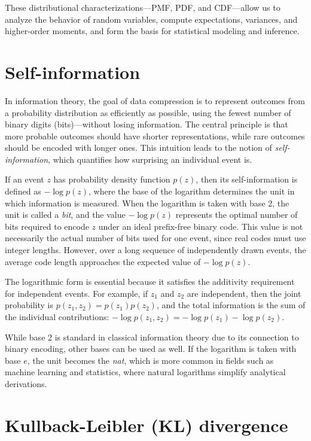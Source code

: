 \documentclass[10pt,twocolumn,article]{memoir}
\begin{document}
These distributional characterizations—PMF, PDF, and CDF—allow us to analyze the behavior of random variables, compute expectations, variances, and higher-order moments, and form the basis for statistical modeling and inference.

\section{Self-information}

In information theory, the goal of data compression is to represent outcomes from a probability distribution as efficiently as possible, using the fewest number of binary digits (bits)—without losing information. The central principle is that more probable outcomes should have shorter representations, while rare outcomes should be encoded with longer ones. This intuition leads to the notion of \textit{self-information}, which quantifies how surprising an individual event is.

If an event $z$ has probability density function $p(z)$, then its self-information is defined as $-\log p(z)$, where the base of the logarithm determines the unit in which information is measured. When the logarithm is taken with base 2, the unit is called a \textit{bit}, and the value $-\log p(z)$ represents the optimal number of bits required to encode $z$ under an ideal prefix-free binary code. This value is not necessarily the actual number of bits used for one event, since real codes must use integer lengths. However, over a long sequence of independently drawn events, the average code length approaches the expected value of $-\log p(z)$.

The logarithmic form is essential because it satisfies the additivity requirement for independent events. For example, if $z_1$ and $z_2$ are independent, then the joint probability is $p(z_1, z_2) = p(z_1)p(z_2)$, and the total information is the sum of the individual contributions: $-\log p(z_1, z_2) = -\log p(z_1) - \log p(z_2)$.

While base 2 is standard in classical information theory due to its connection to binary encoding, other bases can be used as well. If the logarithm is taken with base $e$, the unit becomes the \textit{nat}, which is more common in fields such as machine learning and statistics, where natural logarithms simplify analytical derivations.

\section{Kullback-Leibler (KL) divergence}
\end{document}
